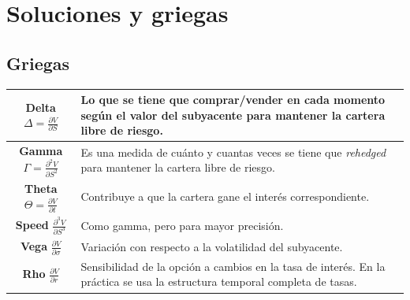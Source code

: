 
\section{Soluciones y griegas}


\subsection{Griegas}
\begin{center}
    \begin{tabularx}{\textwidth}{|c|X|}
        \hline
        \textbf{Delta} $\Delta = \frac{\partial V}{\partial S}$ & Lo que se tiene que comprar/vender en cada momento según el valor del subyacente para mantener la cartera libre de riesgo. \\
        \hline
        \textbf{Gamma} $\Gamma = \frac{\partial^2 V}{\partial S^2}$ & Es una medida de cuánto y cuantas veces se tiene que \textit{rehedged} para mantener la cartera libre de riesgo. \\
        \hline
        \textbf{Theta} $\Theta = \frac{\partial V}{\partial t}$ & Contribuye a que la cartera gane el interés correspondiente. \\
        \hline
        \textbf{Speed} $\frac{\partial^3 V}{\partial S^3}$ & Como gamma, pero para mayor precisión. \\
        \hline
        \textbf{Vega} $\frac{\partial V}{\partial \sigma}$ & Variación con respecto a la volatilidad del subyacente. \\
        \hline
        \textbf{Rho} $\frac{\partial V}{\partial r}$ & Sensibilidad de la opción a cambios en la tasa de interés. En la práctica se usa la estructura temporal completa de tasas. \\
        \hline
    \end{tabularx}
\end{center}



